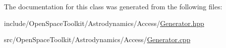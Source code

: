 The documentation for this class was generated from the following files\+:\begin{DoxyCompactItemize}
\item 
include/\+Open\+Space\+Toolkit/\+Astrodynamics/\+Access/\hyperlink{_generator_8hpp}{Generator.\+hpp}\item 
src/\+Open\+Space\+Toolkit/\+Astrodynamics/\+Access/\hyperlink{_generator_8cpp}{Generator.\+cpp}\end{DoxyCompactItemize}
